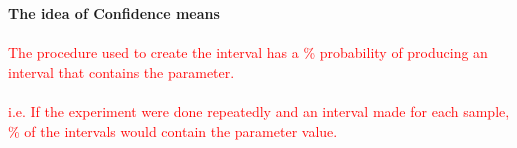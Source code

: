 \large \textbf{The idea of Confidence means}\normalsize\\~\\
\textcolor{red}{The procedure used to create the interval has a \underbar{~~~~}\% probability of producing an interval that contains the parameter.\\~\\
i.e. If the experiment were done repeatedly and an interval made for each sample, \underbar{~~~~}\% of the intervals would contain the parameter value.}

